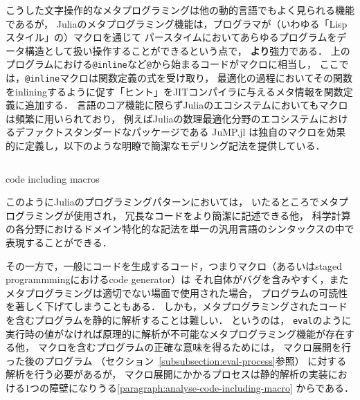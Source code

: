 \inputminted[frame=lines, firstline=3, lastline=12, breaklines]{julia}{src/sums_def.jl}

こうした文字操作的なメタプログラミングは他の動的言語でもよく見られる機能であるが，
Juliaのメタプログラミング機能は，プログラマが（いわゆる「Lispスタイル」の）マクロを通じて
パースタイムにおいてあらゆるプログラムをデータ構造として扱い操作することができるという点で，
\textbf{より}強力である．
上のプログラムにおける\verb|@inline|など\verb|@|から始まるコードがマクロに相当し，
ここでは，\verb|@inline|マクロは関数定義の式を受け取り，
最適化の過程においてその関数をinliningするように促す「ヒント」をJITコンパイラに与えるメタ情報を関数定義に追加する．
言語のコア機能に限らずJuliaのエコシステムにおいてもマクロは頻繁に用いられており，
例えばJuliaの数理最適化分野のエコシステムにおけるデファクトスタンダードなパッケージである
JuMP.jl\cite{DunningHuchetteLubin2017}
は独自のマクロを効果的に定義し，以下のような明瞭で簡潔なモデリング記法を提供している．

\begin{listing}[ht]
  \inputminted[frame=lines, linenos, firstnumber=1, firstline=4, lastline=10]{julia}{src/jump.jl}
  \caption{code including macros}
  \label{lst:target2}
\end{listing}

このようにJuliaのプログラミングパターンにおいては，
いたるところでメタプログラミングが使用され\footnotemark，
冗長なコードをより簡潔に記述できる他，
科学計算の各分野におけるドメイン特化的な記法を単一の汎用言語のシンタックスの中で表現することができる\cite{jeff-phd}．


その一方で，一般にコードを生成するコード，つまりマクロ（あるいはstaged programmmingにおけるcode generator）は
それ自体がバグを含みやすく，またメタプログラミングは適切でない場面で使用された場合，
プログラムの可読性を著しく下げてしまうこともある．
しかも，メタプログラミングされたコードを含むプログラムを静的に解析することは難しい．
というのは，
\verb|eval|のように実行時の値がなければ原理的に解析が不可能なメタプログラミング機能が存在する他，
マクロを含むプログラムの正確な意味を得るためには，
マクロ展開を行った後のプログラム
（セクション~\ref{subsubsection:eval-process}参照）
に対する解析を行う必要があるが，
マクロ展開にかかるプロセスは静的解析の実装における1つの障壁になりうる\ref{paragraph:analyse-code-including-macro}
からである．

